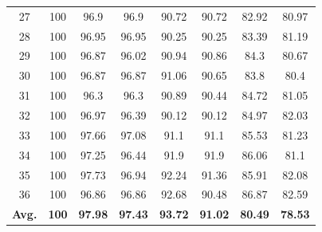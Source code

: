\documentclass[review]{elsarticle}
\begin{document}
\begin{longtable}{c|ccccccc}
		27&100&96.9&96.9&90.72&90.72&82.92&80.97\\
		28&100&96.95&96.95&90.25&90.25&83.39&81.19\\
		29&100&96.87&96.02&90.94&90.86&84.3&80.67\\
		30&100&96.87&96.87&91.06&90.65&83.8&80.4\\
		31&100&96.3&96.3&90.89&90.44&84.72&81.05\\
		32&100&96.97&96.39&90.12&90.12&84.97&82.03\\
		33&100&97.66&97.08&91.1&91.1&85.53&81.23\\
		34&100&97.25&96.44&91.9&91.9&86.06&81.1\\
		35&100&97.73&96.94&92.24&91.36&85.91&82.08\\
		36&100&96.86&96.86&92.68&90.48&86.87&82.59\\
		
		\hline
		\textbf{Avg.}&\textbf{100}&\textbf{97.98}&\textbf{97.43}&\textbf{93.72}&\textbf{91.02}&\textbf{80.49}&\textbf{78.53}\\
		\hline\hline	
\end{longtable}
\end{document}
